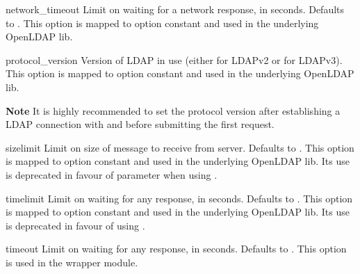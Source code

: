\begin{memberdesc}[LDAP]{network_timeout} %
    Limit on waiting for a network response, in seconds. 
    Defaults to .
    This option is mapped to option constant 
    and used in the underlying OpenLDAP lib.
\end{memberdesc}


\begin{memberdesc}[LDAP]{protocol_version} %
    Version of LDAP in use (either  for LDAPv2
    or  for LDAPv3).
    This option is mapped to option constant 
    and used in the underlying OpenLDAP lib.

\textbf{Note}
It is highly recommended to set the protocol version after establishing
a LDAP connection with  and before submitting
the first request.
\end{memberdesc}


\begin{memberdesc}[LDAP]{sizelimit} %
    Limit on size of message to receive from server. 
    Defaults to .
    This option is mapped to option constant 
    and used in the underlying OpenLDAP lib. Its use is deprecated
    in favour of  parameter when using .
\end{memberdesc}


\begin{memberdesc}[LDAP]{timelimit} %
    Limit on waiting for any response, in seconds. 
    Defaults to .
    This option is mapped to option constant 
    and used in the underlying OpenLDAP lib. Its use is deprecated
    in favour of using .
\end{memberdesc}


\begin{memberdesc}[LDAP]{timeout} %
    Limit on waiting for any response, in seconds. 
    Defaults to .
    This option is used in the wrapper module.
\end{memberdesc}


